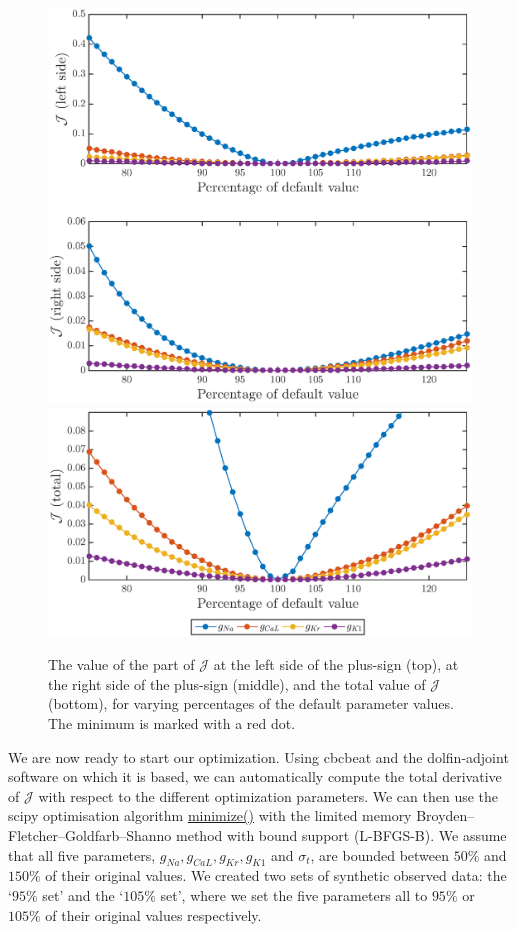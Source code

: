 \documentclass[12pt,a4paper]{article}
\begin{document}
\begin{figure}
\includegraphics[trim=0cm 0cm 0cm 0cm, clip=true, width=1\linewidth]{functional_values} 
\includegraphics[trim=0cm 0cm 0cm 0cm, clip=true, width=1\linewidth]{functional_values2} 
    \caption{The value of the part of $\mathcal{J}$ at the left side of the plus-sign (top), at the right side of the plus-sign (middle), and the total value of $\mathcal{J}$ (bottom), for varying percentages of the default parameter values. The minimum is marked with a red dot. }
    \label{fig:8}
\end{figure}
\newline
We are now ready to start our optimization. Using cbcbeat and the dolfin-adjoint software on which it is based, we can automatically compute the total derivative of $\mathcal{J}$ with respect to the different optimization parameters. We can then use the scipy optimisation algorithm \url{minimize()} with the limited memory Broyden–Fletcher–Goldfarb–Shanno method with bound support (L-BFGS-B). We assume that all five parameters, $g_{Na}, g_{CaL}, g_{Kr}, g_{K1}$ and $\sigma_t$, are bounded between $50\%$ and $150\%$ of their original values. We created two sets of synthetic observed data: the `$95\%$ set' and the `$105\%$ set', where we set the five parameters all to $95\%$ or $105\%$ of their original values respectively. 
\end{document}
